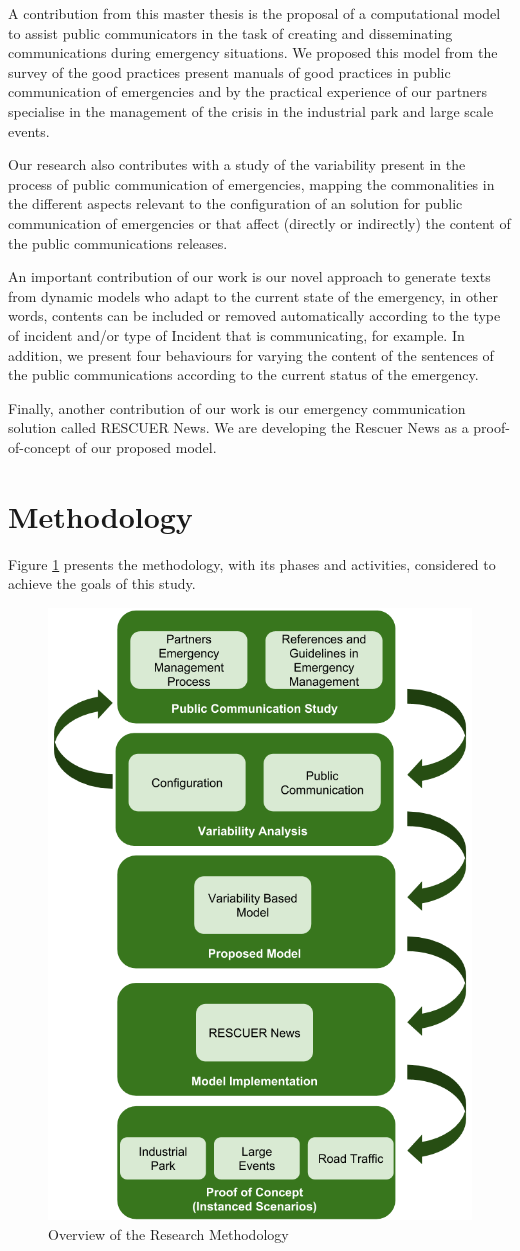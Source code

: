 A contribution from this master thesis is the proposal of a computational model to assist public communicators in the task of creating and disseminating communications during emergency situations. We proposed this model from the survey of the good practices present manuals of good practices in public communication of emergencies and by the practical experience of our partners specialise in the management of the crisis in the industrial park and large scale events.  

Our research also contributes with a study of the variability present in the process of public communication of emergencies, mapping the commonalities in the different aspects relevant to the configuration of an solution for public communication of emergencies or that affect (directly or indirectly) the content of the public communications releases.

An important contribution of our work is our novel approach to generate texts from dynamic models who adapt to the current state of the emergency, in other words, contents can be included or removed automatically according to the type of incident and/or type of Incident that is communicating, for example. In addition, we present four behaviours for varying the content of the sentences of the public communications according to the current status of the emergency.

Finally, another contribution of our work is our emergency communication solution called RESCUER News. We are developing the Rescuer News as a proof-of-concept of our proposed model.

\section{Methodology}

Figure \ref{fig:methodology} presents the methodology, with its phases and activities, considered to achieve the goals of this study.


\begin{figure}[ht!]
\begin{center}
  \includegraphics[width=0.50\linewidth, keepaspectratio]{images/Methodology.png}
\caption{Overview of the Research Methodology}
\label{fig:methodology}
\end{center}
\end{figure}


